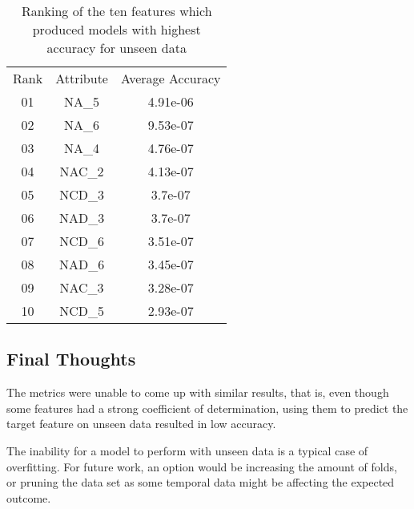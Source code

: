 \documentclass[11pt]{article}
\begin{document}
\begin{table}[h!]
\centering
\normalsize\begin{tabulary}{1.0\textwidth}{CCC}
Rank & Attribute & Average Accuracy \\
01 & NA\_5 & 4.91e-06 \\
02 & NA\_6 & 9.53e-07 \\
03 & NA\_4 & 4.76e-07 \\
04 & NAC\_2 & 4.13e-07 \\
05 & NCD\_3 & 3.7e-07 \\
06 & NAD\_3 & 3.7e-07 \\
07 & NCD\_6 & 3.51e-07 \\
08 & NAD\_6 & 3.45e-07 \\
09 & NAC\_3 & 3.28e-07 \\
10 & NCD\_5 & 2.93e-07 \\
\end{tabulary}
\caption{{Ranking of the ten features which produced models with highest accuracy
for unseen data
{\label{987099}}%
}}
\end{table}
\subsection*{Final Thoughts}
\label{final}
The metrics were unable to come up with similar results, that is, even though some features had a strong coefficient of determination, using them to predict the target feature on unseen data resulted in low accuracy.

The inability for a model to perform with unseen data is a typical case of overfitting. For future work, an option would be increasing the amount of folds, or pruning the data set as some temporal data might be affecting the expected outcome.

\FloatBarrier


\end{document}
